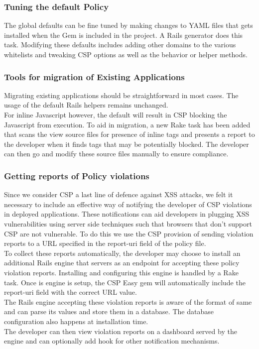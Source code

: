 \documentclass[10pt, conference, compsocconf]{IEEEtran}
\begin{document}
\subsubsection{Tuning the default Policy} %
\label{ssub:tuning_the_default_policy}
The global defaults can be fine tuned by making changes to YAML files that gets installed when the Gem is included in the project. A Rails generator does this task. Modifying these defaults includes adding other domains to the various whitelists and tweaking CSP options as well as the behavior or helper methods.

\subsubsection{Tools for migration of Existing Applications} %
\label{ssub:migration}
Migrating existing applications should be straightforward in most cases. The usage of the default Rails helpers remains unchanged.
\\
For inline Javascript however, the default will result in CSP blocking the Javascript from execution. To aid in migration, a new Rake task has been added that scans the view source files for presence of inline tags and presents a report to the developer when it finds tags that may be potentially blocked. The developer can then go and modify these source files manually to ensure compliance.

\subsubsection{Getting reports of Policy violations} %
\label{ssub:getting_reports_of_policy_violations}
Since we consider CSP a last line of defence against XSS attacks, we felt it necessary to include an effective way of notifying the developer of CSP violations in deployed applications. These notifications can aid developers in plugging XSS vulnerabilities using server side techniques such that browsers that don't support CSP are not vulnerable. To do this we use the CSP provision of sending violation reports to a URL specified in the report-uri field of the policy file.
\\
To collect these reports automatically, the developer may choose to install an additional Rails engine that servers as an endpoint for accepting these policy violation reports. Installing and configuring this engine is handled by a Rake task. Once is engine is setup, the CSP Easy gem will automatically include the report-uri field with the correct URL value.
\\
The Rails engine accepting these violation reports is aware of the format of same and can parse its values and store them in a database. The database configuration also happens at installation time. 
\\
The developer can then view violation reports on a dashboard served by the engine and can optionally add hook for other notification mechanisms.
\end{document}
